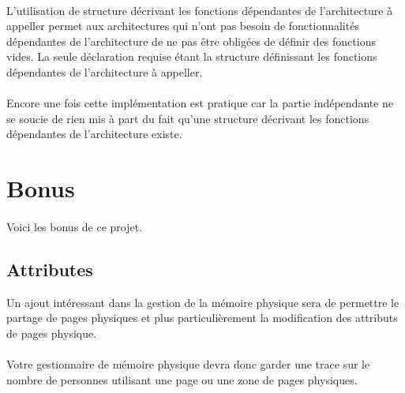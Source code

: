 \documentclass[10pt,a4wide]{article}
\begin{document}
\paragraph{}

L'utilisation de structure d\'ecrivant les fonctions d\'ependantes de
l'architecture \`a appeller permet aux architectures qui n'ont pas
besoin de fonctionnalit\'es d\'ependantes de l'architecture de ne
pas \^etre oblig\'ees de d\'efinir des fonctions vides. La seule d\'eclaration
requise \'etant la structure d\'efinissant les fonctions d\'ependantes
de l'architecture \`a appeller.

\paragraph{}

Encore une fois cette impl\'ementation est pratique car la partie
ind\'ependante ne se soucie de rien mis \`a part du fait qu'une structure
d\'ecrivant les fonctions d\'ependantes de l'architecture existe.

\section{Bonus}

\paragraph{}

Voici les bonus de ce projet.

\subsection{Attributes}

Un ajout int\'eressant dans la gestion de la m\'emoire physique sera
de permettre le partage de pages physiques et plus particuli\`erement
la modification des attributs de pages physique.

\paragraph{}

Votre gestionnaire de m\'emoire physique devra donc garder une trace sur
le nombre de personnes utilisant une page ou une zone de pages physiques.

\paragraph{}
\end{document}
